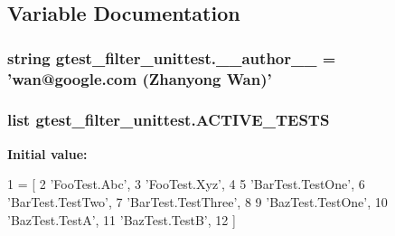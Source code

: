 \subsection{Variable Documentation}
\hypertarget{namespacegtest__filter__unittest_ab3118d06edfd385e21cdb729ecebb968}{
\subsubsection[{\-\_\-\-\_\-author\-\_\-\-\_\-}]{\setlength{\rightskip}{0pt plus 5cm}string gtest\-\_\-filter\-\_\-unittest.\-\_\-\-\_\-author\-\_\-\-\_\- = 'wan@google.\-com (Zhanyong Wan)'}}\label{namespacegtest__filter__unittest_ab3118d06edfd385e21cdb729ecebb968}
\hypertarget{namespacegtest__filter__unittest_a8eb26cb0e0ac81737723cc9d16e1d253}{
\subsubsection[{A\-C\-T\-I\-V\-E\-\_\-\-T\-E\-S\-T\-S}]{\setlength{\rightskip}{0pt plus 5cm}list gtest\-\_\-filter\-\_\-unittest.\-A\-C\-T\-I\-V\-E\-\_\-\-T\-E\-S\-T\-S}}\label{namespacegtest__filter__unittest_a8eb26cb0e0ac81737723cc9d16e1d253}
{\bfseries Initial value\-:}
\begin{DoxyCode}
1 = [
2     \textcolor{stringliteral}{'FooTest.Abc'},
3     \textcolor{stringliteral}{'FooTest.Xyz'},
4 
5     \textcolor{stringliteral}{'BarTest.TestOne'},
6     \textcolor{stringliteral}{'BarTest.TestTwo'},
7     \textcolor{stringliteral}{'BarTest.TestThree'},
8 
9     \textcolor{stringliteral}{'BazTest.TestOne'},
10     \textcolor{stringliteral}{'BazTest.TestA'},
11     \textcolor{stringliteral}{'BazTest.TestB'},
12     ]
\end{DoxyCode}
